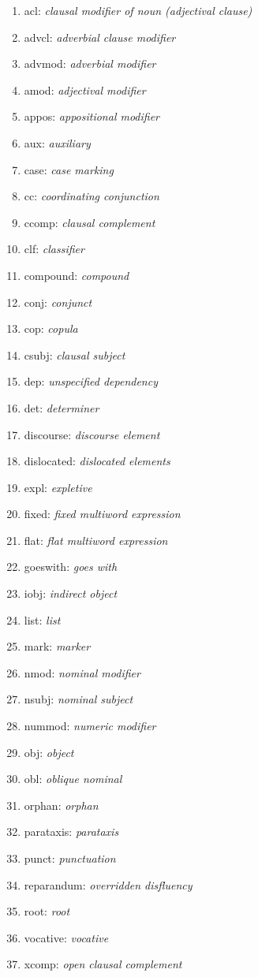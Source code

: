 \begin{multicols}{2}
	\begin{enumerate}
		\item acl: \textit{clausal modifier of noun (adjectival clause)}
		\item advcl: \textit{adverbial clause modifier}
		\item advmod: \textit{adverbial modifier}
		\item amod: \textit{adjectival modifier}
		\item appos: \textit{appositional modifier}
		\item aux: \textit{auxiliary}
		\item case: \textit{case marking}
		\item cc: \textit{coordinating conjunction}
		\item ccomp: \textit{clausal complement}
		\item clf: \textit{classifier}
		\item compound: \textit{compound}
		\item conj: \textit{conjunct}
		\item cop: \textit{copula}
		\item csubj: \textit{clausal subject}
		\item dep: \textit{unspecified dependency}
		\item det: \textit{determiner}
		\item discourse: \textit{discourse element}
		\item dislocated: \textit{dislocated elements}
		\item expl: \textit{expletive}
		\item fixed: \textit{fixed multiword expression}
		\item flat: \textit{flat multiword expression}
		\item goeswith: \textit{goes with}
		\item iobj: \textit{indirect object}
		\item list: \textit{list}
		\item mark: \textit{marker}
		\item nmod: \textit{nominal modifier}
		\item nsubj: \textit{nominal subject}
		\item nummod: \textit{numeric modifier}
		\item obj: \textit{object}
		\item obl: \textit{oblique nominal}
		\item orphan: \textit{orphan}
		\item parataxis: \textit{parataxis}
		\item punct: \textit{punctuation}
		\item reparandum: \textit{overridden disfluency}
		\item root: \textit{root}
		\item vocative: \textit{vocative}
		\item xcomp: \textit{open clausal complement}
	\end{enumerate}
\end{multicols}

